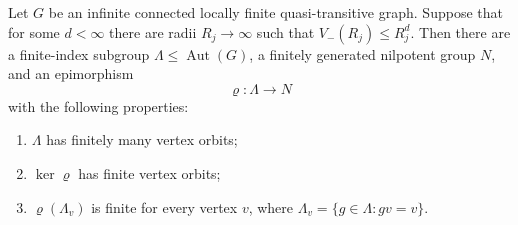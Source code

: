 \begin{proposition}
\label{prop:nilpotent-model}
Let $G$ be an infinite connected locally finite quasi-transitive graph.
Suppose that for some $d<\infty$ there are radii $R_j\to\infty$ such that
$V_-(R_j)\le R_j^d$. Then there are a finite-index subgroup
$\Lambda\le\operatorname{Aut}(G)$, a finitely generated nilpotent group
$N$, and an epimorphism
\[
 \varrho:\Lambda\longrightarrow N
\]
with the following properties:
\begin{enumerate}
 \item $\Lambda$ has finitely many vertex orbits;
 \item $\ker\varrho$ has finite vertex orbits;
 \item $\varrho(\Lambda_v)$ is finite for every vertex $v$, where
 $\Lambda_v=\{g\in\Lambda:gv=v\}$.
\end{enumerate}
\end{proposition}

